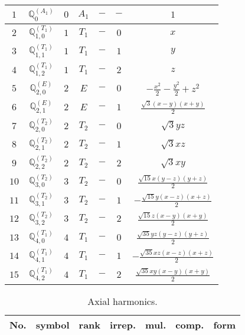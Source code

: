 \documentclass[fleqn,10pt,landscape]{article}
\begin{document}
\begin{itemize}
\begin{center}
\begin{longtable}{ccccccc}
$ 1 $ & $ \mathbb{Q}_{0}^{(A_{1})} $ & $ 0 $ & $ A_{1} $ & $ - $ & $ - $ & $ 1 $ \\ \hline
$ 2 $ & $ \mathbb{Q}_{1,0}^{(T_{1})} $ & $ 1 $ & $ T_{1} $ & $ - $ & $ 0 $ & $ x $ \\
$ 3 $ & $ \mathbb{Q}_{1,1}^{(T_{1})} $ & $ 1 $ & $ T_{1} $ & $ - $ & $ 1 $ & $ y $ \\
$ 4 $ & $ \mathbb{Q}_{1,2}^{(T_{1})} $ & $ 1 $ & $ T_{1} $ & $ - $ & $ 2 $ & $ z $ \\ \hline
$ 5 $ & $ \mathbb{Q}_{2,0}^{(E)} $ & $ 2 $ & $ E $ & $ - $ & $ 0 $ & $ - \frac{x^{2}}{2} - \frac{y^{2}}{2} + z^{2} $ \\
$ 6 $ & $ \mathbb{Q}_{2,1}^{(E)} $ & $ 2 $ & $ E $ & $ - $ & $ 1 $ & $ \frac{\sqrt{3} \left(x - y\right) \left(x + y\right)}{2} $ \\
$ 7 $ & $ \mathbb{Q}_{2,0}^{(T_{2})} $ & $ 2 $ & $ T_{2} $ & $ - $ & $ 0 $ & $ \sqrt{3} y z $ \\
$ 8 $ & $ \mathbb{Q}_{2,1}^{(T_{2})} $ & $ 2 $ & $ T_{2} $ & $ - $ & $ 1 $ & $ \sqrt{3} x z $ \\
$ 9 $ & $ \mathbb{Q}_{2,2}^{(T_{2})} $ & $ 2 $ & $ T_{2} $ & $ - $ & $ 2 $ & $ \sqrt{3} x y $ \\ \hline
$ 10 $ & $ \mathbb{Q}_{3,0}^{(T_{2})} $ & $ 3 $ & $ T_{2} $ & $ - $ & $ 0 $ & $ \frac{\sqrt{15} x \left(y - z\right) \left(y + z\right)}{2} $ \\
$ 11 $ & $ \mathbb{Q}_{3,1}^{(T_{2})} $ & $ 3 $ & $ T_{2} $ & $ - $ & $ 1 $ & $ - \frac{\sqrt{15} y \left(x - z\right) \left(x + z\right)}{2} $ \\
$ 12 $ & $ \mathbb{Q}_{3,2}^{(T_{2})} $ & $ 3 $ & $ T_{2} $ & $ - $ & $ 2 $ & $ \frac{\sqrt{15} z \left(x - y\right) \left(x + y\right)}{2} $ \\ \hline
$ 13 $ & $ \mathbb{Q}_{4,0}^{(T_{1})} $ & $ 4 $ & $ T_{1} $ & $ - $ & $ 0 $ & $ \frac{\sqrt{35} y z \left(y - z\right) \left(y + z\right)}{2} $ \\
$ 14 $ & $ \mathbb{Q}_{4,1}^{(T_{1})} $ & $ 4 $ & $ T_{1} $ & $ - $ & $ 1 $ & $ - \frac{\sqrt{35} x z \left(x - z\right) \left(x + z\right)}{2} $ \\
$ 15 $ & $ \mathbb{Q}_{4,2}^{(T_{1})} $ & $ 4 $ & $ T_{1} $ & $ - $ & $ 2 $ & $ \frac{\sqrt{35} x y \left(x - y\right) \left(x + y\right)}{2} $ \\
\end{longtable}
\end{center}
\begin{center}
\renewcommand{\arraystretch}{1.3}
\begin{longtable}{ccccccc}
\caption{Axial harmonics.}
 \\
 \hline \hline
No. & symbol & rank & irrep. & mul. & comp. & form \\ \hline \endfirsthead


\end{longtable}
\end{center}
\end{itemize}
\end{document}
